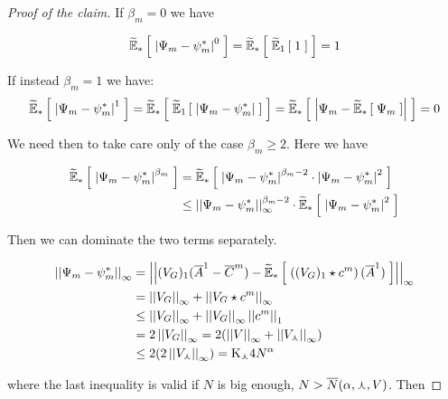 	\begin{proof}[Proof of the claim]
		If $\beta_m =0$ we have
		
		\begin{equation*}
			\widetilde{\mathbb{E}}_{\ast} \left[ \; 
				\left| 
					\Psi_m
					- \psi_m^\ast
				 \right|^0
			 \; \right] = \widetilde{\mathbb{E}}_{\ast} \left[ \;  \widetilde{\mathbb{E}}_{1} \left[ \;  1 \; \right]  \; \right] = 1
		\end{equation*}
		
		If instead $\beta_m =1$ we have:
		\begin{equation*}
			\widetilde{\mathbb{E}}_{\ast} \left[ \; \left| \Psi_m - \psi_m^\ast  \right|^1  \; \right]
			=
			\widetilde{\mathbb{E}}_{\ast} \left[ \; 
				\widetilde{\mathbb{E}}_{1} \left[ \; 
					\left| 
						\Psi_m
						- \psi_m^\ast
					 \right|
			 \; \right] \; \right]
			= 	\widetilde{\mathbb{E}}_{\ast} \left[ \; 
				\left| 
					\Psi_m
					- \widetilde{\mathbb{E}}_{\ast} \left[ \; \Psi_m \; \right]
				 \right|
			 \; \right]	= 0
		\end{equation*}
		
		We need then to take care only of the case $\beta_m \geq 2$.
		Here we have
		
		\begin{align*}
			\widetilde{\mathbb{E}}_{\ast} \left[ \; \left| \Psi_m - \psi_m^\ast  \right|^{\beta_m}  \; \right]
			& =
			\widetilde{\mathbb{E}}_{\ast} \left[ \; \left| \Psi_m - \psi_m^\ast  \right|^{\beta_m - 2} \cdot \left| \Psi_m - \psi_m^\ast  \right|^{2} \; \right]
			\\
			&\leq \left|\left| \Psi_m - \psi_m^\ast  \right|\right|^{\beta_m - 2}_\infty \cdot \widetilde{\mathbb{E}}_{\ast} \left[ \; \left| \Psi_m - \psi_m^\ast  \right|^{2}  \; \right]
		\end{align*}
		
		Then we can dominate the two terms separately.
		
		\begin{align*}
			\left|\left| \Psi_m - \psi_m^\ast  \right|\right|_\infty 
			&= \left|\left| (V_{G})_1(\overline{A}^1 - \overline{C}^m)
				-
				\widetilde{\mathbb{E}}_{\ast} \left[ \;  \left( (V_{G})_1 \star c^m \right) (\overline{A}^1) \; \right]
			 \right|\right|_\infty
			\\
			&=\left|\left| V_{G} \right|\right|_\infty + \left|\left| V_{G} \star c^m \right|\right|_\infty
			\\
			& \leq \left|\left| V_{G} \right|\right|_\infty + \left|\left| V_{G} \right|\right|_\infty \left|\left| c^m \right|\right|_1
			\\
			& = 2 \left|\left| V_{G} \right|\right|_\infty = 2 (\left|\left| V \right|\right|_\infty +  \left|\left| V_\curlywedge \right|\right|_\infty )
			\\
			& \leq 2 (2 \left|\left| V_\curlywedge \right|\right|_\infty ) =  \text{K}_\curlywedge 4 N^{\alpha}
		\end{align*}
		
		where the last inequality is valid if $N$ is big enough, \ie $N > \overline{N}(\alpha, \curlywedge, V)$.
		Then
		

\end{proof}
